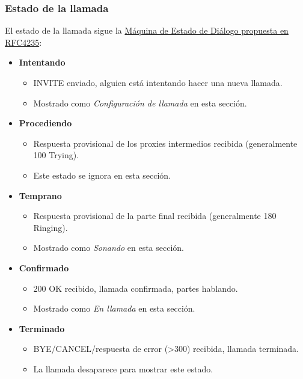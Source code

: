 \documentclass[letterpaper,10pt,spanish]{sphinxmanual}
\begin{document}
\subsubsection{Estado de la llamada}
\label{administration_portal/brand/calls/active_calls:call-state}
El estado de la llamada sigue la \href{https://tools.ietf.org/html/rfc4235\#section-3.7.1}{Máquina de Estado de Diálogo propuesta en RFC4235}:
\begin{itemize}
\item {} 
\textbf{Intentando}
\begin{itemize}
\item {} 
INVITE enviado, alguien está intentando hacer una nueva llamada.

\item {} 
Mostrado como \emph{Configuración de llamada} en esta sección.

\end{itemize}

\item {} 
\textbf{Procediendo}
\begin{itemize}
\item {} 
Respuesta provisional de los proxies intermedios recibida (generalmente 100 Trying).

\item {} 
Este estado se ignora en esta sección.

\end{itemize}

\item {} 
\textbf{Temprano}
\begin{itemize}
\item {} 
Respuesta provisional de la parte final recibida (generalmente 180 Ringing).

\item {} 
Mostrado como \emph{Sonando} en esta sección.

\end{itemize}

\item {} 
\textbf{Confirmado}
\begin{itemize}
\item {} 
200 OK recibido, llamada confirmada, partes hablando.

\item {} 
Mostrado como \emph{En llamada} en esta sección.

\end{itemize}

\item {} 
\textbf{Terminado}
\begin{itemize}
\item {} 
BYE/CANCEL/respuesta de error (\textgreater{}300) recibida, llamada terminada.

\item {} 
La llamada desaparece para mostrar este estado.

\end{itemize}

\end{itemize}
\end{document}
